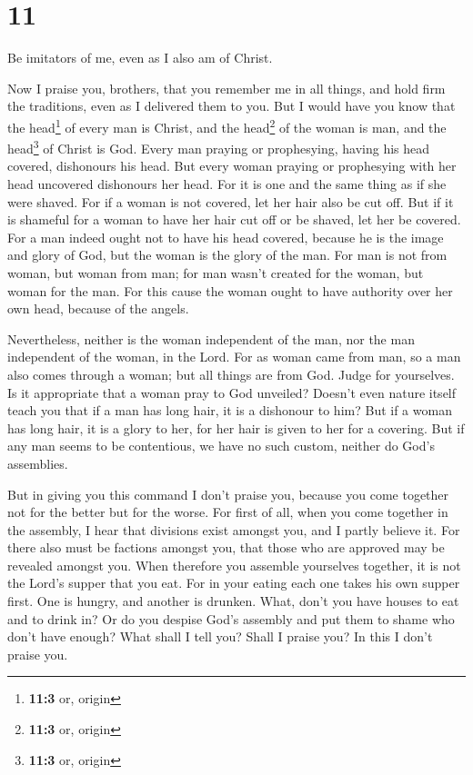 \hypertarget{section-10}{%
\section{11}\label{section-10}}

 Be imitators of me, even as I also am of Christ.

 Now I praise you, brothers, that you remember me in all
things, and hold firm the traditions, even as I delivered them to you.
 But I would have you know that the head\footnote{\textbf{11:3}
  or, origin} of every man is Christ, and the head\footnote{\textbf{11:3}
  or, origin} of the woman is man, and the head\footnote{\textbf{11:3}
  or, origin} of Christ is God.  Every man praying or
prophesying, having his head covered, dishonours his head.
 But every woman praying or prophesying with her head
uncovered dishonours her head. For it is one and the same thing as if
she were shaved.  For if a woman is not covered, let her
hair also be cut off. But if it is shameful for a woman to have her hair
cut off or be shaved, let her be covered.  For a man
indeed ought not to have his head covered, because he is the image and
glory of God, but the woman is the glory of the man.  For
man is not from woman, but woman from man;  for man wasn't
created for the woman, but woman for the man.  For this
cause the woman ought to have authority over her own head, because of
the angels.

 Nevertheless, neither is the woman independent of the
man, nor the man independent of the woman, in the Lord. 
For as woman came from man, so a man also comes through a woman; but all
things are from God.  Judge for yourselves. Is it
appropriate that a woman pray to God unveiled?  Doesn't
even nature itself teach you that if a man has long hair, it is a
dishonour to him?  But if a woman has long hair, it is a
glory to her, for her hair is given to her for a covering.
 But if any man seems to be contentious, we have no such
custom, neither do God's assemblies.

 But in giving you this command I don't praise you,
because you come together not for the better but for the worse.
 For first of all, when you come together in the
assembly, I hear that divisions exist amongst you, and I partly believe
it.  For there also must be factions amongst you, that
those who are approved may be revealed amongst you.  When
therefore you assemble yourselves together, it is not the Lord's supper
that you eat.  For in your eating each one takes his own
supper first. One is hungry, and another is drunken. 
What, don't you have houses to eat and to drink in? Or do you despise
God's assembly and put them to shame who don't have enough? What shall I
tell you? Shall I praise you? In this I don't praise you.


